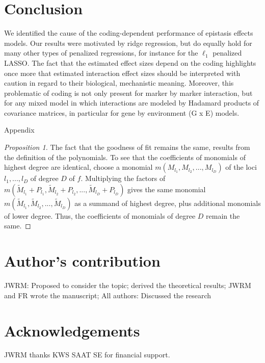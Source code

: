 \documentclass{bmcart}
\newcommand{\0}{\mathbf{0}}
\begin{document}
\section*{Conclusion}
We identified the cause of the coding-dependent performance of epistasis effects models. Our results were motivated by ridge regression, but do equally hold for many other types of penalized regressions, for instance for the $\ell_1$ penalized LASSO. The fact that the estimated effect sizes depend on the coding highlights once more that estimated interaction effect sizes should be interpreted with caution in regard to their biological, mechanistic meaning. Moreover, this problematic of coding is not only present for marker by marker interaction, but for any mixed model in which interactions are modeled by Hadamard products of covariance matrices, in particular for gene by environment (G x E) models.



\newpage
\begin{center} {\huge Appendix } \end{center}
\vspace{0.5cm}
\begin{proof}[Proposition 1]
	The fact that the goodness of fit remains the same, results from the definition of the polynomials. To see that the coefficients of monomials of highest degree are identical, choose a monomial $m(M_{l_1},M_{l_2},...,M_{l_D})$ of the loci $l_1,...,l_D$ of degree $D$ of $f$. Multiplying the factors of $m(\tilde{M}_{l_1}+P_{l_1},\tilde{M}_{l_2}+P_{l_2},...,\tilde{M}_{l_D}+P_{l_D})$ gives the same monomial 
	$m(\tilde{M}_{l_1},\tilde{M}_{l_2},...,\tilde{M}_{l_D})$ as a summand of highest degree, plus additional monomials of lower degree. Thus, the coefficients of monomials of degree $D$ remain the same.
\end{proof}
\section*{Author's contribution}
JWRM: Proposed to consider the topic; derived the theoretical results; JWRM and FR wrote the manuscript;
All authors: Discussed the research



\section*{Acknowledgements}
JWRM thanks KWS SAAT SE for financial support.
\end{document}

